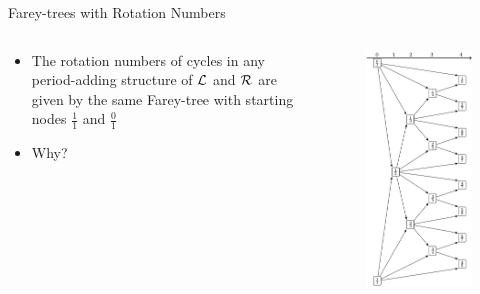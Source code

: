\begin{frame}{Farey-trees with Rotation Numbers}
	\begin{columns}
		\begin{column}{.5 \textwidth}
			\begin{itemize}
				\item The rotation numbers of cycles in any period-adding structure of $\mathcal{L}$ and $\mathcal{R}$ are given by the same Farey-tree with starting nodes $\frac{1}{1}$ and $\frac{0}{1}$
				      \pause
				\item Why?
			\end{itemize}
		\end{column}
		\begin{column}{.5 \textwidth}
			\vspace{-5em}
			\begin{figure}
				\includegraphics[width=.47 \textwidth]{../../Report/Figures/FareyTrees/LR_RotNum/adding.png}
			\end{figure}
		\end{column}
	\end{columns}
\end{frame}

